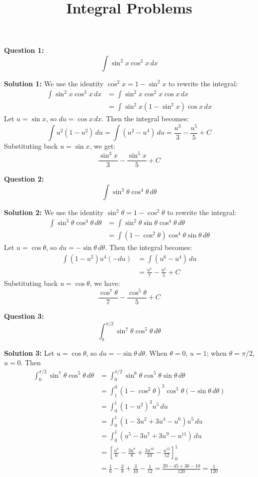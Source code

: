 \documentclass{article}
\title{Integral Problems}
\author{}
\date{}
\begin{document}
\maketitle

\textbf{Question 1:}
\[ \int \sin^2 x \cos^3 x \, dx \]

\textbf{Solution 1:}
\textcolor[rgb]{1.000, 0.000, 0.000}{We use the identity $\cos^2 x = 1 - \sin^2 x$ to rewrite the integral:
\begin{align*} \label{eq:1} \int \sin^2 x \cos^3 x \, dx &= \int \sin^2 x \cos^2 x \cos x \, dx \\ &= \int \sin^2 x (1 - \sin^2 x) \cos x \, dx\end{align*} 
Let $u = \sin x$, so $du = \cos x \, dx$. Then the integral becomes:
\[ \int u^2 (1 - u^2) \, du = \int (u^2 - u^4) \, du = \frac{u^3}{3} - \frac{u^5}{5} + C \]
Substituting back $u = \sin x$, we get:
\[ \frac{\sin^3 x}{3} - \frac{\sin^5 x}{5} + C \]}

\bigskip

\textbf{Question 2:}
\[ \int \sin^3 \theta \cos^4 \theta \, d\theta \]

\textbf{Solution 2:}
\textcolor[rgb]{1.000, 0.000, 0.000}{We use the identity $\sin^2 \theta = 1 - \cos^2 \theta$ to rewrite the integral:
\begin{align*} \int \sin^3 \theta \cos^4 \theta \, d\theta &= \int \sin^2 \theta \sin \theta \cos^4 \theta \, d\theta \\ &= \int (1 - \cos^2 \theta) \cos^4 \theta \sin \theta \, d\theta \end{align*} 
Let $u = \cos \theta$, so $du = -\sin \theta \, d\theta$. Then the integral becomes:
\begin{align*} \int (1 - u^2) u^4 (-du) &= \int (u^6 - u^4) \, du \\ &= \frac{u^7}{7} - \frac{u^5}{5} + C \end{align*} 
Substituting back $u = \cos \theta$, we have:
\[ \frac{\cos^7 \theta}{7} - \frac{\cos^5 \theta}{5} + C \]}

\bigskip

\textbf{Question 3:}
\[ \int_0^{\pi/2} \sin^7 \theta \cos^5 \theta \, d\theta \]

\textbf{Solution 3:}
\textcolor[rgb]{1.000, 0.000, 0.000}{Let $u = \cos \theta$, so $du = -\sin \theta \, d\theta$. When $\theta = 0$, $u = 1$; when $\theta = \pi/2$, $u = 0$. Then
\begin{align*} \int_0^{\pi/2} \sin^7 \theta \cos^5 \theta \, d\theta &= \int_0^{\pi/2} \sin^6 \theta \cos^5 \theta \sin \theta \, d\theta \\ &= \int_1^0 (1 - \cos^2 \theta)^3 \cos^5 \theta (-\sin \theta \, d\theta) \\ &= \int_0^1 (1 - u^2)^3 u^5 \, du \\ &= \int_0^1 (1 - 3u^2 + 3u^4 - u^6) u^5 \, du \\ &= \int_0^1 (u^5 - 3u^7 + 3u^9 - u^{11}) \, du \\ &= \left[ \frac{u^6}{6} - \frac{3u^8}{8} + \frac{3u^{10}}{10} - \frac{u^{12}}{12} \right]_0^1 \\ &= \frac{1}{6} - \frac{3}{8} + \frac{3}{10} - \frac{1}{12} = \frac{20 - 45 + 36 - 10}{120} = \frac{1}{120} \end{align*} }
\end{document}

